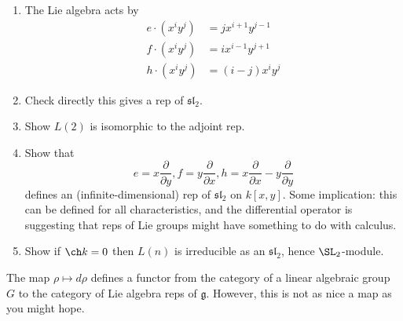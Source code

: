 \documentclass[a4paper]{article}
\newcommand*{\Lie}[1]{\mathfrak{#1}} %
\begin{document}
\begin{ex}\leavevmode
  \begin{enumerate}
  \item The Lie algebra acts by
    \begin{align*}
      e \cdot (x^iy^j) &= jx^{i + 1} y^{j - 1} \\
      f \cdot (x^iy^j) &= ix^{i - 1} y^{j + 1} \\
      h \cdot (x^iy^j) &= (i - j) x^iy^j
    \end{align*}
  \item Check directly this gives a rep of \(\Lie{sl}_2\).
  \item Show \(L(2)\) is isomorphic to the adjoint rep.
  \item Show that
    \[
      e = x \frac{\partial  }{\partial y}, f = y \frac{\partial  }{\partial x}, h = x \frac{\partial  }{\partial x} - y \frac{\partial  }{\partial y}
    \]
    defines an (infinite-dimensional) rep of \(\Lie{sl}_2\) on \(k[x, y]\). Some implication: this can be defined for all characteristics, and the differential operator is suggesting that reps of Lie groups might have something to do with calculus.
  \item Show if \(\ch k = 0\) then \(L(n)\) is irreducible as an \(\Lie{sl}_2\), hence \(\SL_2\)-module.
  \end{enumerate}
\end{ex}

The map \(\rho \mapsto d \rho\) defines a functor from the category of a linear algebraic group \(G\) to the category of Lie algebra reps of \(\Lie g\). However, this is not as nice a map as you might hope.
\end{document}
